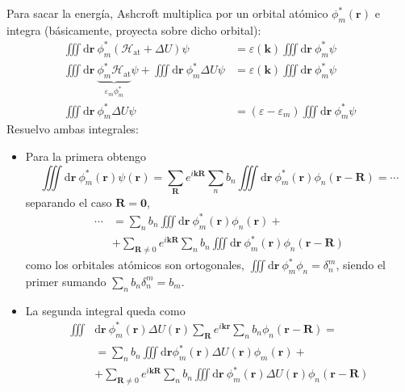 Para sacar la energía, Ashcroft multiplica por un orbital atómico
$\phi_m^* (\mathbf{r})$ e integra (básicamente, proyecta sobre dicho
orbital):
\begin{equation}
\begin{split}
  \iiint \text{d}\mathbf{r}\ \phi_m^* (\mathcal{H}_\text{at} + \Delta
  U) \psi &= \varepsilon(\mathbf{k}) \iiint \text{d}\mathbf{r} \
  \phi_m^* \psi \\
  \iiint \text{d} \mathbf{r}\ \underbrace{\phi_m^*
  \mathcal{H}_\text{at}}_{\varepsilon_m \phi_m^*}\psi +
  \iiint \text{d}\mathbf{r}\ \phi_m^* \Delta U \psi &= \varepsilon(\mathbf{k}) \iiint \text{d}\mathbf{r} \
  \phi_m^* \psi \\
  \iiint \text{d}\mathbf{r} \ \phi_m^* \Delta U \psi &= (\varepsilon -
  \varepsilon_m) \iiint \text{d}\mathbf{r} \ \phi^*_m \psi
\end{split}
\end{equation}
Resuelvo ambas integrales:
\begin{itemize}
\item Para la primera obtengo
\begin{equation}
  \iiint \text{d} \mathbf{r} \ \phi_m^* (\mathbf{r}) \psi(\mathbf{r})
  = \sum_{\mathbf{R}} e^{i \mathbf{k}\mathbf{R}} \sum_{n} b_n \iiint
  \text{d}\mathbf{r} \ \phi_m^* (\mathbf{r}) \phi_n
  (\mathbf{r}-\mathbf{R}) = \cdots
\end{equation}
separando el caso $\mathbf{R} = \mathbf{0}$,
\begin{equation}
  \begin{split}
  \cdots &= \sum_{n} b_n \iiint \text{d} \mathbf{r} \
  \phi_m^*(\mathbf{r})\phi_n(\mathbf{r}) + \\ &+
\sum_{\mathbf{R}\neq 0} e^{i \mathbf{k}\mathbf{R}}\sum_{n} b_n \iiint
\text{d} \mathbf{r} \ \phi_m^*(\mathbf{r})\phi_n(\mathbf{r} - \mathbf{R})
  \end{split}
\end{equation}
como los orbitales atómicos son ortogonales,
$\iiint \text{d}\mathbf{r}\ \phi_m^* \phi_n = \delta_n^m$, siendo el
primer sumando $\sum_{n} b_n \delta_n^m = b_m$.
\item La segunda integral queda como
\begin{equation}
  \begin{split}
  \iiint &\text{d}\mathbf{r}\ \phi_m^* (\mathbf{r}) \Delta
  U(\mathbf{r}) \sum_{\mathbf{R}} e^{i \mathbf{k}\mathbf{r}} \sum_{n}
  b_n \phi_n (\mathbf{r}-\mathbf{R}) =   \\ &= \sum_{n}b_n \iiint
  \text{d}\mathbf{r} \phi_m^* (\mathbf{r}) \Delta U (\mathbf{r})
  \phi_m (\mathbf{r})    + \\ &+     \sum_{\mathbf{R}\neq 0} e^{i \mathbf{k}
    \mathbf{R}} \sum_{n} b_n \iiint \text{d}\mathbf{r} \ \phi_m^*
  (\mathbf{r}) \Delta U (\mathbf{r}) \phi_n (\mathbf{r}-\mathbf{R})
  \end{split}
\end{equation}
\end{itemize}

